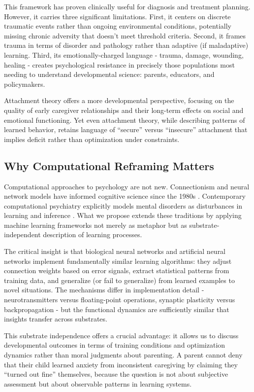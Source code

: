 \documentclass{article}
\begin{document}
This framework has proven clinically useful for diagnosis and treatment planning. However, it carries three significant limitations. First, it centers on discrete traumatic events rather than ongoing environmental conditions, potentially missing chronic adversity that doesn't meet threshold criteria. Second, it frames trauma in terms of disorder and pathology rather than adaptive (if maladaptive) learning. Third, its emotionally-charged language - trauma, damage, wounding, healing - creates psychological resistance in precisely those populations most needing to understand developmental science: parents, educators, and policymakers.

Attachment theory \cite{bowlby1969,ainsworth1978} offers a more developmental perspective, focusing on the quality of early caregiver relationships and their long-term effects on social and emotional functioning. Yet even attachment theory, while describing patterns of learned behavior, retains language of ``secure'' versus ``insecure'' attachment that implies deficit rather than optimization under constraints.

\subsection{Why Computational Reframing Matters}

Computational approaches to psychology are not new. Connectionism and neural network models have informed cognitive science since the 1980s \cite{rumelhart1986}. Contemporary computational psychiatry explicitly models mental disorders as disturbances in learning and inference \cite{huys2016}. What we propose extends these traditions by applying machine learning frameworks not merely as metaphor but as substrate-independent description of learning processes.

The critical insight is that biological neural networks and artificial neural networks implement fundamentally similar learning algorithms: they adjust connection weights based on error signals, extract statistical patterns from training data, and generalize (or fail to generalize) from learned examples to novel situations. The mechanisms differ in implementation detail - neurotransmitters versus floating-point operations, synaptic plasticity versus backpropagation - but the functional dynamics are sufficiently similar that insights transfer across substrates.

This substrate independence offers a crucial advantage: it allows us to discuss developmental outcomes in terms of training conditions and optimization dynamics rather than moral judgments about parenting. A parent cannot deny that their child learned anxiety from inconsistent caregiving by claiming they ``turned out fine'' themselves, because the question is not about subjective assessment but about observable patterns in learning systems.
\end{document}
